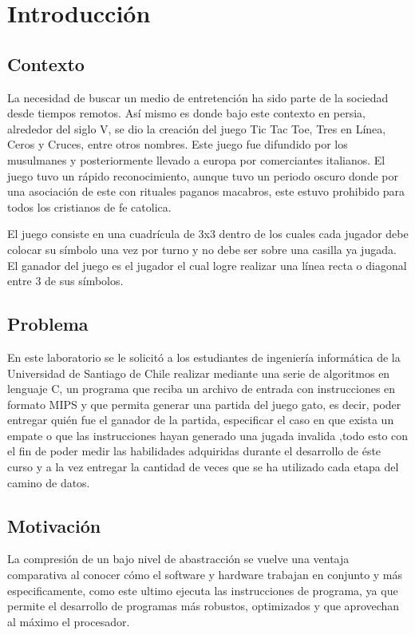 \section{Introducción}

\subsection{Contexto}
\noindent La necesidad de buscar un medio de entretención ha sido parte de la sociedad desde tiempos remotos. Así mismo es donde bajo este contexto en persia, alrededor del siglo V, se dio la creación del juego Tic Tac Toe, Tres en Línea, Ceros y Cruces, entre otros nombres. Este juego fue difundido por los musulmanes y posteriormente llevado a europa por comerciantes italianos. El juego tuvo un rápido reconocimiento, aunque tuvo un periodo oscuro donde por una asociación de este con rituales paganos macabros, este estuvo prohibido para todos los cristianos de fe catolica. \citep{TicTacToe}

\noindent El juego consiste en una cuadrícula de 3x3 dentro de los cuales cada jugador debe colocar su símbolo una vez por turno y no debe ser sobre una casilla ya jugada. El ganador del juego es el jugador el cual logre realizar una línea recta o diagonal entre 3 de sus símbolos.

\subsection{Problema}

\noindent En este laboratorio se le solicitó a los estudiantes de ingeniería informática de la Universidad de Santiago de Chile realizar mediante una serie de algoritmos en lenguaje C, un programa que reciba un archivo de entrada con instrucciones en formato MIPS y que permita generar una partida del juego gato, es decir, poder entregar quién fue el ganador de la partida, especificar el caso en que exista un empate o que las instrucciones hayan generado una jugada invalida ,todo esto con el fin de poder medir las habilidades adquiridas durante el desarrollo de éste curso y a la vez entregar la cantidad de veces que se ha utilizado cada etapa del camino de datos.

\subsection{Motivación}
\noindent La compresión de un bajo nivel de abastracción se vuelve una ventaja comparativa al conocer cómo el software y hardware trabajan en conjunto y más especificamente, como este ultimo ejecuta las instrucciones de programa, ya que permite el desarrollo de programas más robustos, optimizados y que aprovechan al máximo el procesador.

